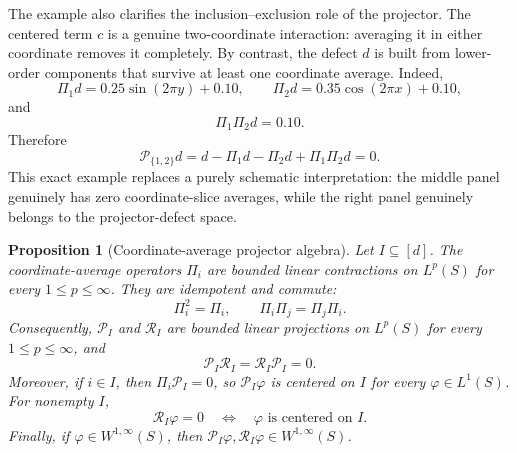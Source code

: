 \documentclass[11pt,letterpaper]{article}
\newtheorem{proposition}[theorem]{Proposition}
\theoremstyle{definition}
\theoremstyle{remark}
\begin{document}
The example also clarifies the inclusion--exclusion role of the projector. The
centered term $c$ is a genuine two-coordinate interaction: averaging it in
either coordinate removes it completely. By contrast, the defect $d$ is built
from lower-order components that survive at least one coordinate average.
Indeed,
\[
\Pi_1d
=
0.25\sin(2\pi y)+0.10,
\qquad
\Pi_2d
=
0.35\cos(2\pi x)+0.10,
\]
and
\[
\Pi_1\Pi_2d=0.10.
\]
Therefore
\[
\mathcal P_{\{1,2\}}d
=
d-\Pi_1d-\Pi_2d+\Pi_1\Pi_2d
=
0.
\]
This exact example replaces a purely schematic interpretation: the middle
panel genuinely has zero coordinate-slice averages, while the right panel
genuinely belongs to the projector-defect space.





\begin{proposition}[Coordinate-average projector algebra]
\label{prop:coordinate_projector_algebra}
Let $I\subseteq[d]$. The coordinate-average operators $\Pi_i$ are bounded linear
contractions on $L^p(S)$ for every $1\le p\le\infty$. They are idempotent and
commute:
$$
\Pi_i^2=\Pi_i,
\qquad
\Pi_i\Pi_j=\Pi_j\Pi_i .
$$
Consequently, $\mathcal P_I$ and $\mathcal R_I$ are bounded linear projections
on $L^p(S)$ for every $1\le p\le\infty$, and
$$
\mathcal P_I\mathcal R_I=\mathcal R_I\mathcal P_I=0.
$$
Moreover, if $i\in I$, then $\Pi_i\mathcal P_I=0$, so
$\mathcal P_I\varphi$ is centered on $I$ for every $\varphi\in L^1(S)$.
For nonempty $I$,
$$
\mathcal R_I\varphi=0
\quad\Longleftrightarrow\quad
\varphi \text{ is centered on } I.
$$
Finally, if $\varphi\in W^{1,\infty}(S)$, then
$\mathcal P_I\varphi,\mathcal R_I\varphi\in W^{1,\infty}(S)$.
\end{proposition}
\end{document}
